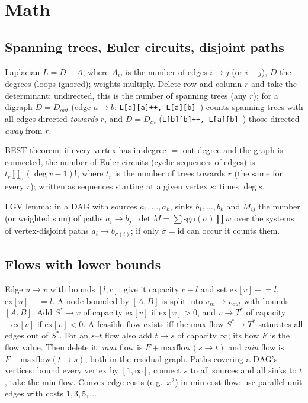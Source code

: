 \section{Math}
	\subsection{Spanning trees, Euler circuits, disjoint paths}
		Laplacian $L = D - A$, where $A_{ij}$ is the number of edges $i \to j$ (or $i - j$), $D$ the degrees (loops ignored); weights multiply.
		Delete row and column $r$ and take the determinant: undirected, this is the number of spanning trees (any $r$);
		for a digraph $D = D_{out}$ (edge $a \to b$: \texttt{L[a][a]++, L[a][b]--}) counts spanning trees with all edges directed \emph{towards} $r$,
		and $D = D_{in}$ (\texttt{L[b][b]++, L[a][b]--}) those directed \emph{away} from $r$.

		BEST theorem: if every vertex has in-degree $=$ out-degree and the graph is connected, the number of Euler circuits (cyclic sequences of edges) is
		$t_r \prod_v (\deg v - 1)!$, where $t_r$ is the number of trees towards $r$ (the same for every $r$); written as sequences starting at a given vertex $s$: times $\deg s$.

		LGV lemma: in a DAG with sources $a_1, \dots, a_k$, sinks $b_1, \dots, b_k$ and $M_{ij}$ the number (or weighted sum) of paths $a_i \to b_j$,
		$\det M = \sum \mathrm{sgn}(\sigma) \prod w$ over the systems of vertex-disjoint paths $a_i \to b_{\sigma(i)}$; if only $\sigma = \mathrm{id}$ can occur it counts them.

	\subsection{Flows with lower bounds}
		Edge $u \to v$ with bounds $[l, c]$: give it capacity $c - l$ and set $\mathrm{ex}[v] \mathrel{+}= l$, $\mathrm{ex}[u] \mathrel{-}= l$.
		A node bounded by $[A, B]$ is split into $v_{in} \to v_{out}$ with bounds $[A, B]$.
		Add $S^* \to v$ of capacity $\mathrm{ex}[v]$ if $\mathrm{ex}[v] > 0$, and $v \to T^*$ of capacity $-\mathrm{ex}[v]$ if $\mathrm{ex}[v] < 0$.
		A feasible flow exists iff the max flow $S^* \to T^*$ saturates all edges out of $S^*$.
		For an $s$--$t$ flow also add $t \to s$ of capacity $\infty$; its flow $F$ is the flow value.
		Then delete it: \emph{max} flow is $F + \mathrm{maxflow}(s \to t)$ and \emph{min} flow is $F - \mathrm{maxflow}(t \to s)$, both in the residual graph.
		Paths covering a DAG's vertices: bound every vertex by $[1, \infty]$, connect $s$ to all sources and all sinks to $t$, take the min flow.
		Convex edge costs (e.g.\ $x^2$) in min-cost flow: use parallel unit edges with costs $1, 3, 5, \dots$

